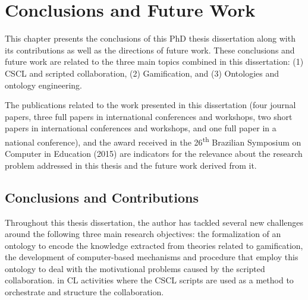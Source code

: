 \chapter{Conclusions and Future Work}
\label{chapter:conclusions} 

This chapter presents the conclusions of this PhD thesis dissertation along with its contributions as well as the directions of future work.
These conclusions and future work are related to the three main topics combined in this dissertation: (1) CSCL and scripted collaboration, (2) Gamification, and (3) Ontologies and ontology engineering.

The publications related to the work presented in this dissertation (four journal papers, three full papers in international conferences and workshops, two short papers in international conferences and workshops, and one full paper in a national conference), and the award received in the 26\textsuperscript{th} Brazilian Symposium on Computer in Education (2015) are indicators for the relevance about the research problem addressed in this thesis and the future work derived from it.

\section{Conclusions and Contributions}
\label{sec:conclusions-contributions}

Throughout this thesis dissertation, the author has tackled several new challenges around the following three main research objectives: the formalization of an ontology to encode the knowledge extracted from theories related to gamification, the development of computer-based mechanisms and procedure that employ this ontology to deal with the motivational problems caused by the scripted collaboration. 
in CL activities where the CSCL scripts are used as a method to orchestrate and structure the collaboration.


